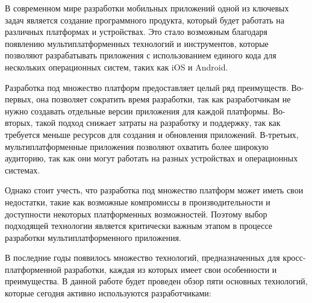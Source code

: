 \documentclass[14pt, russian]{scrartcl}
\begin{document}
В современном мире разработки мобильных приложений одной из ключевых задач является создание программного продукта, который будет работать на различных платформах и устройствах. Это стало возможным благодаря появлению мультиплатформенных технологий и инструментов, которые позволяют разрабатывать приложения с использованием единого кода для нескольких операционных систем, таких как iOS и Android.

Разработка под множество платформ предоставляет целый ряд преимуществ. Во-первых, она позволяет сократить время разработки, так как разработчикам не нужно создавать отдельные версии приложения для каждой платформы. Во-вторых, такой подход снижает затраты на разработку и поддержку, так как требуется меньше ресурсов для создания и обновления приложений. В-третьих, мультиплатформенные приложения позволяют охватить более широкую аудиторию, так как они могут работать на разных устройствах и операционных системах.

Однако стоит учесть, что разработка под множество платформ может иметь свои недостатки, такие как возможные компромиссы в производительности и доступности некоторых платформенных возможностей. Поэтому выбор подходящей технологии является критически важным этапом в процессе разработки мультиплатформенного приложения.

В последние годы появилось множество технологий, предназначенных для кросс-платформенной разработки, каждая из которых имеет свои особенности и преимущества. В данной работе будет проведен обзор пяти основных технологий, которые сегодня активно используются разработчиками:
\end{document}
